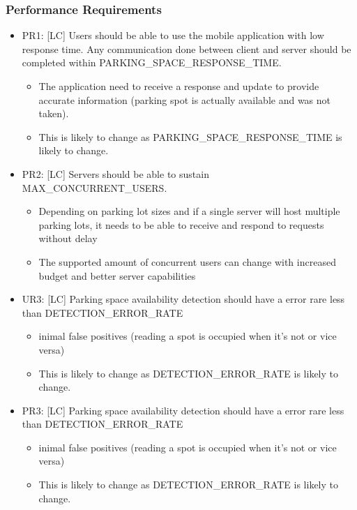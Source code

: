 \documentclass[]{article}
\begin{document}
\subsubsection{Performance Requirements}
\begin{itemize}
	\item PR1: [LC] Users should be able to use the mobile application with low response time. Any communication done between client and server should be completed within PARKING\_SPACE\_RESPONSE\_TIME.
	\begin{itemize}
		\item The application need to receive a response and update to provide accurate information (parking spot is actually available and was not taken).
		\item This is likely to change as PARKING\_SPACE\_RESPONSE\_TIME is likely to change.
	\end{itemize}

	\item PR2: [LC] Servers should be able to sustain MAX\_CONCURRENT\_USERS.
	\begin{itemize}
		\item Depending on parking lot sizes and if a single server will host multiple parking lots, it needs to be able to receive and respond to requests without delay
		\item The supported amount of concurrent users can change with increased budget and better server capabilities
	\end{itemize}

	\item UR3: [LC] Parking space availability detection should have a error rare less than DETECTION\_ERROR\_RATE
	\begin{itemize}
		\item inimal false positives (reading a spot is occupied when it’s not or vice versa)
		\item This is likely to change as DETECTION\_ERROR\_RATE is likely to change.
	\end{itemize}

	\item PR3: [LC] Parking space availability detection should have a error rare less than DETECTION\_ERROR\_RATE
	\begin{itemize}
		\item inimal false positives (reading a spot is occupied when it’s not or vice versa)
		\item This is likely to change as DETECTION\_ERROR\_RATE is likely to change.
	\end{itemize}
\end{itemize}
\end{document}
